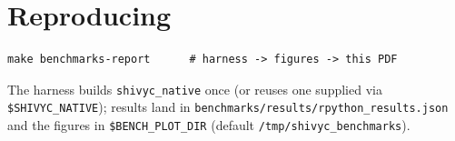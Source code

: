 \documentclass[11pt]{article}
\begin{document}


\section{Reproducing}

\begin{verbatim}
make benchmarks-report      # harness -> figures -> this PDF
\end{verbatim}

\noindent
The harness builds \texttt{shivyc\_native} once (or reuses one supplied via
\texttt{\$SHIVYC\_NATIVE}); results land in
\texttt{benchmarks/results/rpython\_results.json} and the figures in
\texttt{\$BENCH\_PLOT\_DIR} (default \texttt{/tmp/shivyc\_benchmarks}).
\end{document}
